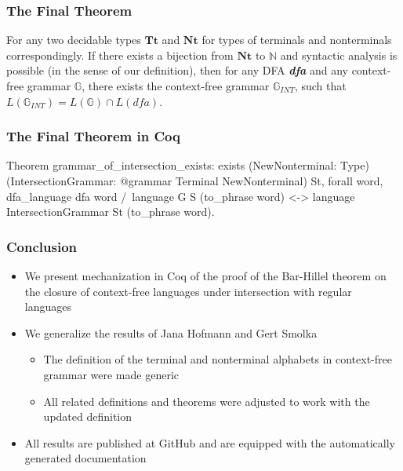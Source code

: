 \documentclass[xcolor=table]{beamer}
\begin{document}
\begin{frame}[fragile] \frametitle{The Final Theorem}

\begin{theorem}
    For any two decidable types $\textbf{Tt}$ and $\textbf{Nt}$ for types of terminals and nonterminals correspondingly. If there exists a bijection from $\textbf{Nt}$ to $\mathbb{N}$ and syntactic analysis is possible (in the sense of our definition), then for any DFA \textbf{\textit{dfa}} and any context-free grammar $\mathbb{G}$, there exists the context-free grammar $\mathbb{G}_{INT}$, such that $L(\mathbb{G}_{INT}) = L(\mathbb{G}) \cap L(\textit{dfa})$.
\end{theorem}

\end{frame}

\begin{frame}[fragile] \frametitle{The Final Theorem in Coq}

      \begin{pyglist}[language=coq, numbers=none, numbersep=5pt]

  Theorem grammar_of_intersection_exists:
    exists
     (NewNonterminal: Type)
     (IntersectionGrammar: @grammar Terminal NewNonterminal)
     St,
    forall word,
      dfa_language dfa word /\ language G S (to_phrase word)
      <->
      language IntersectionGrammar St (to_phrase word).
     \end{pyglist}

\end{frame}

\begin{frame} \frametitle{Conclusion}

\begin{itemize}
 \item We present mechanization in Coq of the proof of the Bar-Hillel theorem on the closure of context-free languages under intersection with regular languages
 \pause
 \item We generalize the results of Jana Hofmann and Gert Smolka
 \begin{itemize}
   \item The definition of the terminal and nonterminal alphabets in context-free grammar were made generic
   \item All related definitions and theorems were adjusted to work with the updated definition

 \end{itemize}
 \pause
 \item All results are published at GitHub and are equipped with the automatically generated documentation

\end{itemize}

\end{frame}
\end{document}
